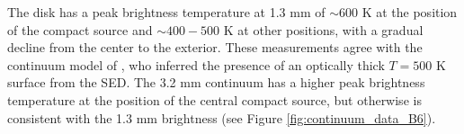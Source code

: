 \documentclass[twocolumn]{aastex61}
\begin{document}
The disk has a peak brightness temperature at 1.3 mm of $\sim600$ K at the
position of the compact source and $\sim400-500$ K at other positions, with a
gradual decline from the center to the exterior.  These measurements agree with
the continuum model of \citet{Plambeck2016a}, who inferred the presence of an
optically thick $T=500$ K surface from the SED.  The 3.2 mm continuum has a
higher peak brightness temperature at the position of the central compact
source, but otherwise is consistent with the 1.3 mm brightness (see Figure
\ref{fig:continuum_data_B6}).

\end{document}
